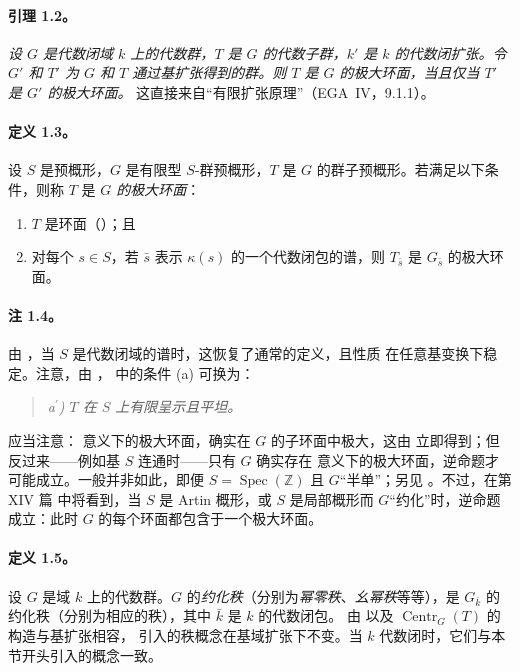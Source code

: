 \paragraph{\textbf{引理 1.2。}}
\emph{设 \(G\) 是代数闭域 \(k\) 上的代数群，\(T\) 是 \(G\) 的代数子群，\(k'\) 是 \(k\) 的代数闭扩张。令 \(G'\) 和 \(T'\) 为 \(G\) 和 \(T\) 通过基扩张得到的群。则 \(T\) 是 \(G\) 的极大环面，当且仅当 \(T'\) 是 \(G'\) 的极大环面。}
这直接来自“有限扩张原理”（EGA~IV，9.1.1）。
\paragraph{\textbf{定义 1.3。}}
设 \(S\) 是预概形，\(G\) 是有限型 \(S\)-群预概形，\(T\) 是 \(G\) 的群子预概形。若满足以下条件，则称 \(T\) 是 \emph{\(G\) 的极大环面}：
\begin{enumerate}
\renewcommand{\labelenumi}{\alph{enumi})}
\item \(T\) 是环面（）；且
\item 对每个 \(s\in S\)，若 \(\bar s\) 表示 \(\kappa(s)\) 的一个代数闭包的谱，则 \(T_{\bar s}\) 是 \(G_{\bar s}\) 的极大环面。
\end{enumerate}
\paragraph{\textbf{注 1.4。}}
由 ，当 \(S\) 是代数闭域的谱时，这恢复了通常的定义，且性质  在任意基变换下稳定。注意，由 ， 中的条件 (a) 可换为：
\begin{quote}
\textit{a\(^{\prime}\)) \(T\) 在 \(S\) 上有限呈示且平坦。}
\end{quote}
应当注意： 意义下的极大环面，确实在 \(G\) 的子环面中极大，这由  立即得到；但反过来——例如基 \(S\) 连通时——只有 \(G\) 确实存在  意义下的极大环面，逆命题才可能成立。一般并非如此，即便 \(S=\operatorname{Spec}(\mathbb Z)\) 且 \(G\)“半单”；另见 。不过，在第 XIV 篇 中将看到，当 \(S\) 是 Artin 概形，或 \(S\) 是局部概形而 \(G\)“约化”时，逆命题成立：此时 \(G\) 的每个环面都包含于一个极大环面。
\paragraph{\textbf{定义 1.5。}}
设 \(G\) 是域 \(k\) 上的代数群。\(G\) 的\emph{约化秩}（分别为\emph{幂零秩}、\emph{幺幂秩}等等），是 \(G_{\bar k}\) 的约化秩（分别为相应的秩），其中 \(\bar k\) 是 \(k\) 的代数闭包。
由  以及 \(\operatorname{Centr}_G(T)\) 的构造与基扩张相容， 引入的秩概念在基域扩张下不变。当 \(k\) 代数闭时，它们与本节开头引入的概念一致。
